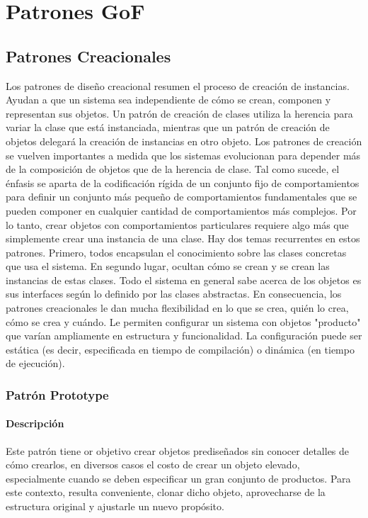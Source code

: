\chapter{Patrones GoF}
\section{Patrones Creacionales}
Los patrones de diseño creacional resumen el proceso de creación de instancias. Ayudan a que un sistema sea independiente de cómo se crean, componen y representan sus objetos. Un patrón de creación de clases utiliza la herencia para variar la clase que está instanciada, mientras que un patrón de creación de objetos delegará la creación de instancias en otro objeto. Los patrones de creación se vuelven importantes a medida que los sistemas evolucionan para depender más de la composición de objetos que de la herencia de clase. Tal como sucede, el énfasis se aparta de la codificación rígida de un conjunto fijo de comportamientos para definir un conjunto más pequeño de comportamientos fundamentales que se pueden componer en cualquier cantidad de comportamientos más complejos. Por lo tanto, crear objetos con comportamientos particulares requiere algo más que simplemente crear una instancia de una clase. Hay dos temas recurrentes en estos patrones. Primero, todos encapsulan el conocimiento sobre las clases concretas que usa el sistema. En segundo lugar, ocultan cómo se crean y se crean las instancias de estas clases. Todo el sistema en general sabe acerca de los objetos es sus interfaces según lo definido por las clases abstractas. En consecuencia, los patrones creacionales le dan mucha flexibilidad en lo que se crea, quién lo crea, cómo se crea y cuándo. Le permiten configurar un sistema con objetos "producto" que varían ampliamente en estructura y funcionalidad. La configuración puede ser estática (es decir, especificada en tiempo de compilación) o dinámica (en tiempo de ejecución).\cite{gof}
\subsection{Patrón Prototype}
\subsubsection{Descripción}
Este patrón tiene or objetivo crear objetos prediseñados sin conocer detalles de cómo crearlos, en diversos casos el costo de crear un objeto elevado, especialmente cuando se deben especificar un gran conjunto de productos. Para este contexto, resulta conveniente, clonar dicho objeto, aprovecharse de la estructura original y ajustarle un nuevo propósito. \\
\\
\\
\\
